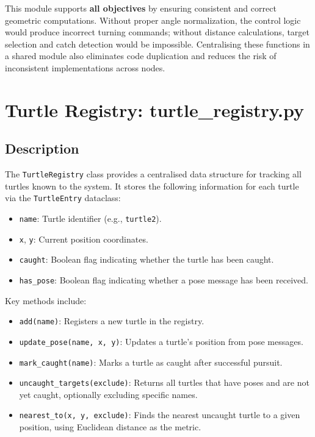 This module supports \textbf{all objectives} by ensuring consistent and correct geometric computations. Without proper angle normalization, the control logic would produce incorrect turning commands; without distance calculations, target selection and catch detection would be impossible. Centralising these functions in a shared module also eliminates code duplication and reduces the risk of inconsistent implementations across nodes.

\section{Turtle Registry: turtle\_registry.py}

\subsection{Description}

The \texttt{TurtleRegistry} class provides a centralised data structure for tracking all turtles known to the system. It stores the following information for each turtle via the \texttt{TurtleEntry} dataclass:

\begin{itemize}
  \item \texttt{name}: Turtle identifier (e.g., \texttt{turtle2}).
  \item \texttt{x}, \texttt{y}: Current position coordinates.
  \item \texttt{caught}: Boolean flag indicating whether the turtle has been caught.
  \item \texttt{has\_pose}: Boolean flag indicating whether a pose message has been received.
\end{itemize}

Key methods include:

\begin{itemize}
  \item \texttt{add(name)}: Registers a new turtle in the registry.
  \item \texttt{update\_pose(name, x, y)}: Updates a turtle's position from pose messages.
  \item \texttt{mark\_caught(name)}: Marks a turtle as caught after successful pursuit.
  \item \texttt{uncaught\_targets(exclude)}: Returns all turtles that have poses and are not yet caught, optionally excluding specific names.
  \item \texttt{nearest\_to(x, y, exclude)}: Finds the nearest uncaught turtle to a given position, using Euclidean distance as the metric.
\end{itemize}

